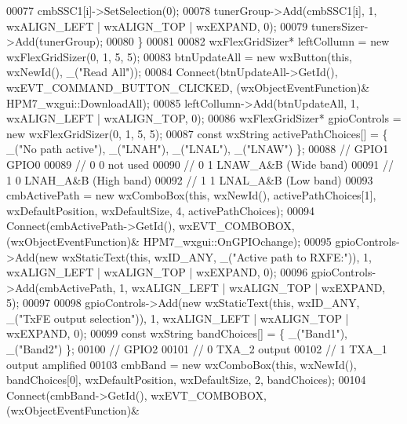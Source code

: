 \begin{DoxyCode}
{{00077         cmbSSC1[i]->SetSelection(0);
00078         tunerGroup->Add(cmbSSC1[i], 1, wxALIGN\_LEFT | wxALIGN\_TOP | wxEXPAND, 0);
00079         tunersSizer->Add(tunerGroup);
00080     \}
00081 
00082     wxFlexGridSizer* leftCollumn = \textcolor{keyword}{new} wxFlexGridSizer(0, 1, 5, 5);
00083     btnUpdateAll = \textcolor{keyword}{new} wxButton(\textcolor{keyword}{this}, wxNewId(), \_(\textcolor{stringliteral}{"Read All"}));
00084     Connect(btnUpdateAll->GetId(), wxEVT\_COMMAND\_BUTTON\_CLICKED, (wxObjectEventFunction)&
      HPM7_wxgui::DownloadAll);
00085     leftCollumn->Add(btnUpdateAll, 1, wxALIGN\_LEFT | wxALIGN\_TOP, 0);
00086     wxFlexGridSizer* gpioControls = \textcolor{keyword}{new} wxFlexGridSizer(0, 1, 5, 5);
00087     \textcolor{keyword}{const} wxString activePathChoices[] = \{ \_(\textcolor{stringliteral}{"No path active"}), \_(\textcolor{stringliteral}{"LNAH"}), \_(\textcolor{stringliteral}{"LNAL"}), \_(\textcolor{stringliteral}{"LNAW"}) \};
00088     \textcolor{comment}{// GPIO1 GPIO0}
00089     \textcolor{comment}{//   0     0  not used}
00090     \textcolor{comment}{//   0     1  LNAW\_A&B (Wide band)}
00091     \textcolor{comment}{//   1     0  LNAH\_A&B (High band)}
00092     \textcolor{comment}{//   1     1  LNAL\_A&B (Low band)}
00093     cmbActivePath = \textcolor{keyword}{new} wxComboBox(\textcolor{keyword}{this}, wxNewId(), activePathChoices[1], wxDefaultPosition, wxDefaultSize,
       4, activePathChoices);
00094     Connect(cmbActivePath->GetId(), wxEVT\_COMBOBOX, (wxObjectEventFunction)&
      HPM7_wxgui::OnGPIOchange);
00095     gpioControls->Add(\textcolor{keyword}{new} wxStaticText(\textcolor{keyword}{this}, wxID\_ANY, \_(\textcolor{stringliteral}{"Active path to RXFE:"})), 1, wxALIGN\_LEFT | 
      wxALIGN\_TOP | wxEXPAND, 0);
00096     gpioControls->Add(cmbActivePath, 1, wxALIGN\_LEFT | wxALIGN\_TOP | wxEXPAND, 5);
00097 
00098     gpioControls->Add(\textcolor{keyword}{new} wxStaticText(\textcolor{keyword}{this}, wxID\_ANY, \_(\textcolor{stringliteral}{"TxFE output selection"})), 1, wxALIGN\_LEFT | 
      wxALIGN\_TOP | wxEXPAND, 0);
00099     \textcolor{keyword}{const} wxString bandChoices[] = \{ \_(\textcolor{stringliteral}{"Band1"}), \_(\textcolor{stringliteral}{"Band2"}) \};
00100     \textcolor{comment}{// GPIO2}
00101     \textcolor{comment}{//   0  TXA\_2 output}
00102     \textcolor{comment}{//   1  TXA\_1 output amplified}
00103     cmbBand = \textcolor{keyword}{new} wxComboBox(\textcolor{keyword}{this}, wxNewId(), bandChoices[0], wxDefaultPosition, wxDefaultSize, 2, 
      bandChoices);
00104     Connect(cmbBand->GetId(), wxEVT\_COMBOBOX, (wxObjectEventFunction)&
}}
\end{DoxyCode}

